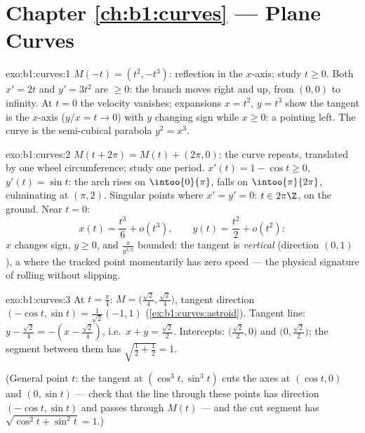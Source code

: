 \section*{Chapter \ref{ch:b1:curves} --- Plane Curves}

\begin{solution}{exo:b1:curves:1}
$M(-t) = (t^2, -t^3)$: reflection in the $x$-axis; study $t \geq 0$.
Both $x' = 2t$ and $y' = 3t^2$ are $\geq 0$: the branch moves
right and up, from $(0,0)$ to infinity. At $t = 0$ the velocity
vanishes; expansions $x = t^2$, $y = t^3$ show the tangent is the
$x$-axis ($y/x = t \to 0$) with $y$ changing sign while $x \geq 0$:
a \emph{} pointing left. The curve is the semi-cubical parabola
$y^2 = x^3$.
\end{solution}

\begin{solution}{exo:b1:curves:2}
$M(t + 2\pi) = M(t) + (2\pi, 0)$: the curve repeats, translated by
one wheel circumference; study one period. $x'(t) = 1 - \cos t \geq
0$, $y'(t) = \sin t$: the arch rises on $\intoo{0}{\pi}$, falls on
$\intoo{\pi}{2\pi}$, culminating at $(\pi, 2)$. Singular points
where $x' = y' = 0$: $t \in 2\pi\Z$, on the ground. Near $t = 0$:
\[
x(t) = \frac{t^3}{6} + o(t^3),
\qquad
y(t) = \frac{t^2}{2} + o(t^2):
\]
$x$ changes sign, $y \geq 0$, and $\frac{x}{y^{3/2}}$ bounded: the
tangent is \emph{vertical} (direction $(0,1)$), a  where the
tracked point momentarily has zero speed --- the physical signature
of rolling without slipping.
\end{solution}

\begin{solution}{exo:b1:curves:3}
At $t = \frac\pi4$: $M = \bigl(\frac{\sqrt2}{4},
\frac{\sqrt2}{4}\bigr)$, tangent direction $(-\cos t, \sin t) =
\frac{1}{\sqrt2}(-1, 1)$ (\cref{ex:b1:curves:astroid}). Tangent
line: $y - \frac{\sqrt2}{4} = -(x - \frac{\sqrt2}{4})$, i.e.\ $x +
y = \frac{\sqrt2}{2}$. Intercepts: $\bigl(\frac{\sqrt2}{2},
0\bigr)$ and $\bigl(0, \frac{\sqrt2}{2}\bigr)$; the segment between
them has  $\sqrt{\frac12 + \frac12} = 1$.

(General point $t$: the tangent at $(\cos^3 t, \sin^3 t)$ cuts the
axes at $(\cos t, 0)$ and $(0, \sin t)$ --- check that the line
through these points has direction $(-\cos t, \sin t)$ and passes
through $M(t)$ --- and the cut segment has  $\sqrt{\cos^2 t +
\sin^2 t} = 1$.)
\end{solution}

